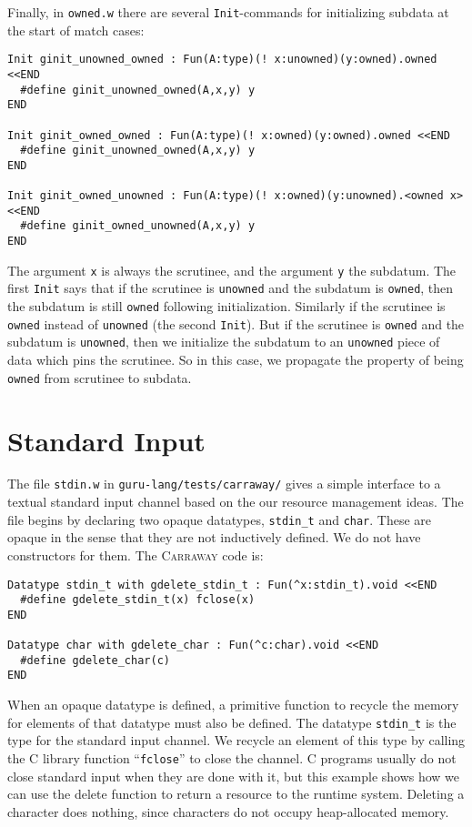 \documentclass{book}[12pt]
\newcommand{\carraway}[0]{\textsc{Carraway}\xspace}
\begin{document}
Finally, in \texttt{owned.w} there are several \texttt{Init}-commands
for initializing subdata at the start of match cases:

{\footnotesize
\begin{verbatim}
Init ginit_unowned_owned : Fun(A:type)(! x:unowned)(y:owned).owned <<END
  #define ginit_unowned_owned(A,x,y) y
END

Init ginit_owned_owned : Fun(A:type)(! x:owned)(y:owned).owned <<END
  #define ginit_unowned_owned(A,x,y) y
END

Init ginit_owned_unowned : Fun(A:type)(! x:owned)(y:unowned).<owned x> <<END
  #define ginit_owned_unowned(A,x,y) y
END
\end{verbatim}
}

\noindent The argument \texttt{x} is always the scrutinee, and the
argument \texttt{y} the subdatum.  The first \texttt{Init} says that
if the scrutinee is \texttt{unowned} and the subdatum is
\texttt{owned}, then the subdatum is still \texttt{owned} following
initialization.  Similarly if the scrutinee is \texttt{owned} instead
of \texttt{unowned} (the second \texttt{Init}).  But if the scrutinee
is \texttt{owned} and the subdatum is \texttt{unowned}, then we
initialize the subdatum to an \texttt{unowned} piece of data which
pins the scrutinee.  So in this case, we propagate the property of
being \texttt{owned} from scrutinee to subdata.

\section{Standard Input}

The file \texttt{stdin.w} in \texttt{guru-lang/tests/carraway/} gives
a simple interface to a textual standard input channel based on the
our resource management ideas.  The file begins by declaring two
opaque datatypes, \texttt{stdin\_t} and \texttt{char}.  These are
opaque in the sense that they are not inductively defined.  We do not
have constructors for them.  The \carraway code is:

\begin{verbatim}
Datatype stdin_t with gdelete_stdin_t : Fun(^x:stdin_t).void <<END
  #define gdelete_stdin_t(x) fclose(x)
END

Datatype char with gdelete_char : Fun(^c:char).void <<END
  #define gdelete_char(c) 
END
\end{verbatim}

\noindent When an opaque datatype is defined, a primitive function to
recycle the memory for elements of that datatype must also be defined.
The datatype \texttt{stdin\_t} is the type for the standard input
channel.  We recycle an element of this type by calling the C library
function ``\texttt{fclose}'' to close the channel.  C programs usually
do not close standard input when they are done with it, but this
example shows how we can use the delete function to return a resource
to the runtime system.  Deleting a character does nothing, since
characters do not occupy heap-allocated memory.
\end{document}
